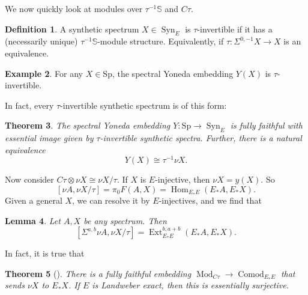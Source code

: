 \documentclass{shortart}
\newtheorem{thm}{Theorem}[section]
\newtheorem{lemma}[thm]{Lemma}
\theoremstyle{definition}
\newtheorem{defi}[thm]{Definition}
\newtheorem{eg}[thm]{Example}
\renewcommand\S{{\mathbb{S}}}
\newcommand\Sp{{\mathrm{Sp}}}
\DeclareMathOperator\Hom{Hom}
\DeclareMathOperator\Syn{Syn}
\begin{document}
We now quickly look at modules over $\tau^{-1} \S$ and $C\tau$.
\begin{defi}
  A synthetic spectrum $X \in \Syn_E$ is $\tau$-invertible if it has a (necessarily unique) $\tau^{-1} \S$-module structure. Equivalently, if $\tau \colon \Sigma^{0, -1} X \to X$ is an equivalence.
\end{defi}

\begin{eg}
  For any $X \in \Sp$, the spectral Yoneda embedding $Y(X)$ is $\tau$-invertible.
\end{eg}

In fact, every $\tau$-invertible synthetic spectrum is of this form:
\begin{thm}
  The spectral Yoneda embedding $Y \colon \Sp \to \Syn_E$ is fully faithful with essential image given by $\tau$-invertible synthetic spectra. Further, there is a natural equivalence
  \[
    Y(X) \cong \tau^{-1} \nu X.
  \]
\end{thm}

Now consider $C\tau \otimes \nu X \cong \nu X / \tau$. If $X$ is $E$-injective, then $\nu X = y(X)$. So
\[
  [\nu A, \nu X / \tau] = \pi_0 F(A, X) = \Hom_{E_*E}(E_*A, E_* X).
\]
Given a general $X$, we can resolve it by $E$-injectives, and we find that
\begin{lemma}
  Let $A, X$ be any spectrum. Then
  \[
    [\Sigma^{a, b} \nu A, \nu X / \tau] = \operatorname{Ext}_{E_*E}^{b, a + b}(E_*A, E_*X).
  \]
\end{lemma}

In fact, it is true that
\begin{thm}[{\cite[Theorem 4.46, Proposition 4.53]{synthetic}}]
  There is a fully faithful embedding $\operatorname{Mod}_{C\tau} \to \operatorname{Comod}_{E_*E}$ that sends $\nu X$ to $E_* X$. If $E$ is Landweber exact, then this is essentially surjective.
\end{thm}


\end{document}
